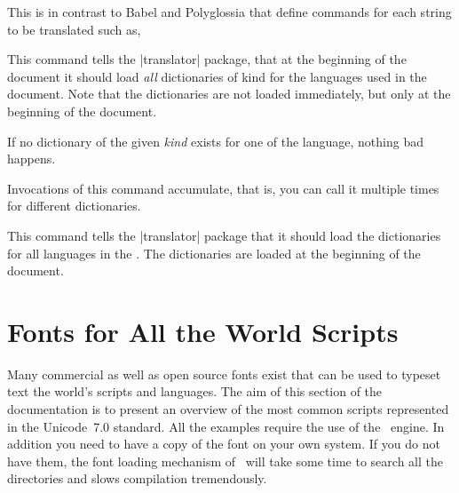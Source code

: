 This is in contrast to Babel and Polyglossia that define
commands for each string to be translated such as,

\begin{teXXX}
\def\captionsdutch{%
    \def\prefacename{Voorwoord}%
    \def\refname{Referenties}%
    \def\abstractname{Samenvatting}%
    \def\bibname{Bibliografie}%
    \def\chaptername{Hoofdstuk}%
    \def\appendixname{Bijlage}%
    \def\contentsname{Inhoudsopgave}%
    \def\listfigurename{Lijst van figuren}%
    \def\listtablename{Lijst van tabellen}%
    \def\indexname{Index}%
    \def\figurename{Figuur}%
    \def\tablename{Tabel}%
    \def\partname{Deel}%
    \def\enclname{Bijlage(n)}%
    \def\ccname{cc}%
    \def\headtoname{Aan}%
    \def\pagename{Pagina}%
    \def\seename{zie}%
    \def\alsoname{zie ook}%
    \def\proofname{Bewijs}%
    \def\glossaryname{Verklarende woordenlijst}%
    \def\today{\number\day~\ifcase\month%
      \or januari\or februari\or maart\or april\or mei\or juni\or
      juli\or augustus\or september\or oktober\or november\or
      december\fi
      \space \number\year}}
\end{teXXX}

\begin{macro}{\usedictionary}
  This command tells the |translator| package, that at the beginning of
  the document it should load \textit{all} dictionaries of kind  for
  the languages used in the document. Note that the dictionaries are
  not loaded immediately, but only at the beginning of the document.

  If no dictionary of the given \emph{kind} exists for one of the
  language, nothing bad happens.

  Invocations of this command accumulate, that is, you can call it
  multiple times for different dictionaries.
\end{macro}

  This command tells the |translator| package that it should load the
  dictionaries for all languages in the . The
  dictionaries are loaded at the beginning of the document.

\section{Fonts for All the World Scripts}

Many commercial as well as open source fonts exist that can be used to typeset text the world's scripts and languages. The aim of this section of the documentation is to present an overview of the most common scripts represented in the Unicode~7.0 standard. All the examples require the use of the \XeTeX\ engine. In addition you need to have a copy of the font on your own system. If you do not have them, the font loading mechanism of \XeTeX\ will take some time to search all the directories and slows compilation tremendously. 




